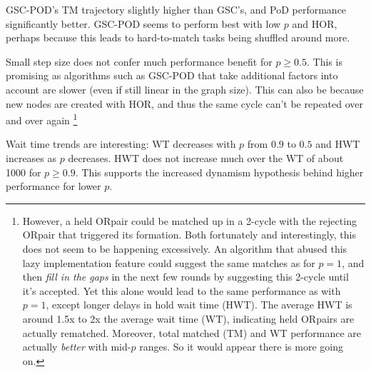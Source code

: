 \documentclass[main.tex]{subfiles}
\begin{document}
GSC-POD's TM trajectory slightly higher than GSC's, and PoD performance significantly better. GSC-POD seems to perform best with low $p$ and HOR, perhaps because this leads to hard-to-match tasks being shuffled around more.

Small step size does not confer much performance benefit for $p \geq 0.5$. This is promising as algorithms such as GSC-POD that take additional factors into account are slower (even if still linear in the graph size). This can also be because new nodes are created with HOR, and thus the same cycle can't be repeated over and over again \footnote{However, a held ORpair could be matched up in a 2-cycle with the rejecting ORpair that triggered its formation. Both fortunately and interestingly, this does not seem to be happening excessively. An algorithm that abused this lazy implementation feature could suggest the same matches as for $p=1$, and then \textit{fill in the gaps} in the next few rounds by suggesting this 2-cycle until it's accepted. Yet this alone would lead to the same performance as with $p=1$, except longer delays in hold wait time (HWT). The average HWT is around 1.5x to 2x the average wait time (WT), indicating held ORpairs are actually rematched. Moreover, total matched (TM) and WT performance are actually \textit{better} with mid-$p$ ranges. So it would appear there is more going on.}

Wait time trends are interesting: WT decreases with $p$ from $0.9$ to $0.5$ and HWT increases as $p$ decreases. HWT does not increase much over the WT of about 1000 for $p \geq 0.9$. This supports the increased dynamism hypothesis behind higher performance for lower $p$.
\end{document}
